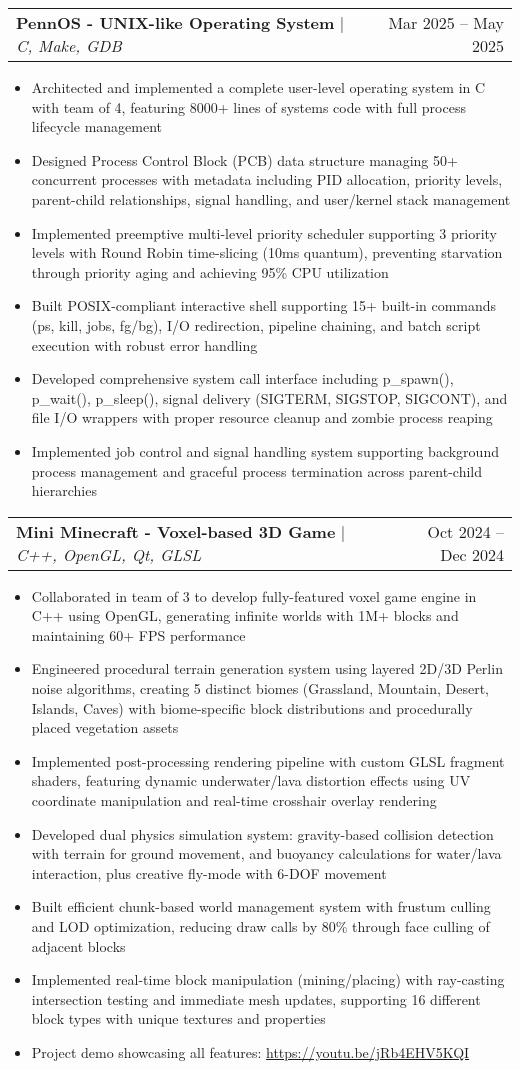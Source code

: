 \documentclass[letterpaper,11pt]{article}
\makeatletter
\newcommand{\resumeItem}[1]{
  \item\small{
    {#1 \vspace{-3pt}}
  }
}
\newcommand{\resumeProjectHeading}[2]{
    \item
    \begin{tabular*}{0.97\textwidth}{l@{\extracolsep{\fill}}r}
      \small#1 & #2 \\
    \end{tabular*}\vspace{-7pt}
}
\newcommand{\resumeItemListStart}{\begin{itemize}}
\newcommand{\resumeItemListEnd}{\end{itemize}\vspace{-5pt}}
\makeatother
\begin{document}
    \resumeProjectHeading
        {\textbf{PennOS - UNIX-like Operating System} $|$ \emph{C, Make, GDB}}{Mar 2025 -- May 2025}
        \resumeItemListStart
        \resumeItem{Architected and implemented a complete user-level operating system in C with team of 4, featuring 8000+ lines of systems code with full process lifecycle management}
        \resumeItem{Designed Process Control Block (PCB) data structure managing 50+ concurrent processes with metadata including PID allocation, priority levels, parent-child relationships, signal handling, and user/kernel stack management}
        \resumeItem{Implemented preemptive multi-level priority scheduler supporting 3 priority levels with Round Robin time-slicing (10ms quantum), preventing starvation through priority aging and achieving 95\% CPU utilization}
        \resumeItem{Built POSIX-compliant interactive shell supporting 15+ built-in commands (ps, kill, jobs, fg/bg), I/O redirection, pipeline chaining, and batch script execution with robust error handling}
        \resumeItem{Developed comprehensive system call interface including p\_spawn(), p\_wait(), p\_sleep(), signal delivery (SIGTERM, SIGSTOP, SIGCONT), and file I/O wrappers with proper resource cleanup and zombie process reaping}
        \resumeItem{Implemented job control and signal handling system supporting background process management and graceful process termination across parent-child hierarchies}
        \resumeItemListEnd
          
    \resumeProjectHeading
          {\textbf{Mini Minecraft - Voxel-based 3D Game} $|$ \emph{C++, OpenGL, Qt, GLSL}}{Oct 2024 -- Dec 2024}
          \resumeItemListStart
          \resumeItem{Collaborated in team of 3 to develop fully-featured voxel game engine in C++ using OpenGL, generating infinite worlds with 1M+ blocks and maintaining 60+ FPS performance}
          \resumeItem{Engineered procedural terrain generation system using layered 2D/3D Perlin noise algorithms, creating 5 distinct biomes (Grassland, Mountain, Desert, Islands, Caves) with biome-specific block distributions and procedurally placed vegetation assets}
          \resumeItem{Implemented post-processing rendering pipeline with custom GLSL fragment shaders, featuring dynamic underwater/lava distortion effects using UV coordinate manipulation and real-time crosshair overlay rendering}
          \resumeItem{Developed dual physics simulation system: gravity-based collision detection with terrain for ground movement, and buoyancy calculations for water/lava interaction, plus creative fly-mode with 6-DOF movement}
          \resumeItem{Built efficient chunk-based world management system with frustum culling and LOD optimization, reducing draw calls by 80\% through face culling of adjacent blocks}
          \resumeItem{Implemented real-time block manipulation (mining/placing) with ray-casting intersection testing and immediate mesh updates, supporting 16 different block types with unique textures and properties}
          \resumeItem{Project demo showcasing all features: \url{https://youtu.be/jRb4EHV5KQI}}
          \resumeItemListEnd
\end{document}
